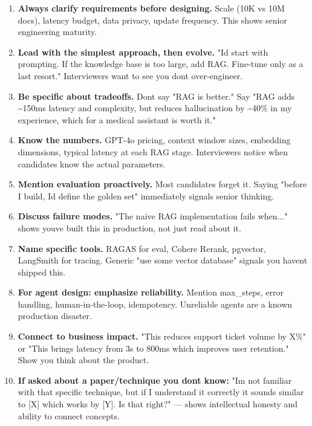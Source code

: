 \documentclass[11pt]{article}
\begin{document}
\begin{enumerate}
\def\labelenumi{\arabic{enumi}.}
\item
  \textbf{Always clarify requirements before designing.} Scale (10K vs 10M docs), latency budget, data privacy, update frequency. This shows senior engineering maturity.
\item
  \textbf{Lead with the simplest approach, then evolve.} "I\textquotesingle d start with prompting. If the knowledge base is too large, add RAG. Fine-tune only as a last resort." Interviewers want to see you don\textquotesingle t over-engineer.
\item
  \textbf{Be specific about tradeoffs.} Don\textquotesingle t say "RAG is better." Say "RAG adds \textasciitilde150ms latency and complexity, but reduces hallucination by \textasciitilde40\% in my experience, which for a medical assistant is worth it."
\item
  \textbf{Know the numbers.} GPT-4o pricing, context window sizes, embedding dimensions, typical latency at each RAG stage. Interviewers notice when candidates know the actual parameters.
\item
  \textbf{Mention evaluation proactively.} Most candidates forget it. Saying "before I build, I\textquotesingle d define the golden set" immediately signals senior thinking.
\item
  \textbf{Discuss failure modes.} "The naive RAG implementation fails when..." shows you\textquotesingle ve built this in production, not just read about it.
\item
  \textbf{Name specific tools.} RAGAS for eval, Cohere Rerank, pgvector, LangSmith for tracing. Generic "use some vector database" signals you haven\textquotesingle t shipped this.
\item
  \textbf{For agent design: emphasize reliability.} Mention max\_steps, error handling, human-in-the-loop, idempotency. Unreliable agents are a known production disaster.
\item
  \textbf{Connect to business impact.} "This reduces support ticket volume by X\%" or "This brings latency from 3s to 800ms which improves user retention." Show you think about the product.
\item
  \textbf{If asked about a paper/technique you don\textquotesingle t know:} "I\textquotesingle m not familiar with that specific technique, but if I understand it correctly it sounds similar to {[}X{]} which works by {[}Y{]}. Is that right?" --- shows intellectual honesty and ability to connect concepts.
\end{enumerate}
\end{document}
